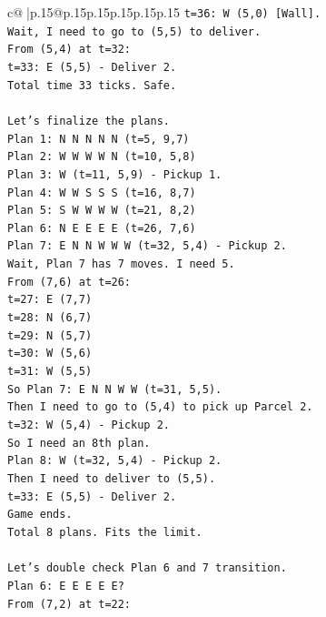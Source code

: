 \documentclass{article}
\begin{document}
{\begin{supertabular}{c@{$\;$}|p{.15\linewidth}@{}p{.15\linewidth}p{.15\linewidth}p{.15\linewidth}p{.15\linewidth}p{.15\linewidth}}
{{{\texttt{t=36: W (5,0) {[}Wall{]}.} \\
\texttt{Wait, I need to go to (5,5) to deliver.} \\
\texttt{From (5,4) at t=32:} \\
\texttt{t=33: E (5,5) {-} Deliver 2.} \\
\texttt{Total time 33 ticks. Safe.} \\
\\ 
\texttt{Let's finalize the plans.} \\
\texttt{Plan 1: N N N N N (t=5, 9,7)} \\
\texttt{Plan 2: W W W W N (t=10, 5,8)} \\
\texttt{Plan 3: W (t=11, 5,9) {-} Pickup 1.} \\
\texttt{Plan 4: W W S S S (t=16, 8,7)} \\
\texttt{Plan 5: S W W W W (t=21, 8,2)} \\
\texttt{Plan 6: N E E E E (t=26, 7,6)} \\
\texttt{Plan 7: E N N W W W (t=32, 5,4) {-} Pickup 2.} \\
\texttt{Wait, Plan 7 has 7 moves. I need 5.} \\
\texttt{From (7,6) at t=26:} \\
\texttt{t=27: E (7,7)} \\
\texttt{t=28: N (6,7)} \\
\texttt{t=29: N (5,7)} \\
\texttt{t=30: W (5,6)} \\
\texttt{t=31: W (5,5)} \\
\texttt{So Plan 7: E N N W W (t=31, 5,5).} \\
\texttt{Then I need to go to (5,4) to pick up Parcel 2.} \\
\texttt{t=32: W (5,4) {-} Pickup 2.} \\
\texttt{So I need an 8th plan.} \\
\texttt{Plan 8: W (t=32, 5,4) {-} Pickup 2.} \\
\texttt{Then I need to deliver to (5,5).} \\
\texttt{t=33: E (5,5) {-} Deliver 2.} \\
\texttt{Game ends.} \\
\texttt{Total 8 plans. Fits the limit.} \\
\\ 
\texttt{Let's double check Plan 6 and 7 transition.} \\
\texttt{Plan 6: E E E E E?} \\
\texttt{From (7,2) at t=22:} \\
}}}
\end{supertabular}}
\end{document}
